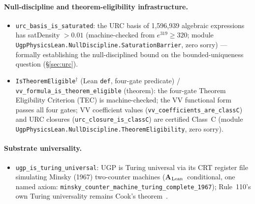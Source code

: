 \documentclass[11pt]{article}
\theoremstyle{remark}
\newcommand{\CatAL}{\textbf{A}$_{\rm Lean}$}
\begin{document}
\begin{appendices}
\paragraph{Null-discipline and theorem-eligibility infrastructure.}
\begin{sloppypar}
\begin{itemize}[leftmargin=1.2em,itemsep=0.1em,topsep=0.2em]
  \item \texttt{urc\_basis\_is\_saturated}: the URC basis of 1,596,939 algebraic expressions has satDensity $>0.01$ (machine-checked from $e^{319}\ge320$; module \texttt{UgpPhysicsLean.NullDiscipline.SaturationBarrier}, zero sorry) --- formally establishing the null-disciplined bound on the bounded-uniqueness question (\S\ref{sec:urc}).
  \item \texttt{IsTheoremEligible}$^{\dagger}$ (Lean \texttt{def}, four-gate predicate) / \texttt{vv\_formula\_is\_theorem\_eligible} (theorem): the four-gate Theorem Eligibility Criterion (TEC) is machine-checked; the VV functional form passes all four gates; VV coefficient values (\texttt{vv\_coefficients\_are\_classC}) and URC closures (\texttt{urc\_closure\_is\_classC}) are certified Class~C (module \texttt{UgpPhysicsLean.NullDiscipline.TheoremEligibility}, zero sorry).
\end{itemize}
\end{sloppypar}

\paragraph{Substrate universality.}
\begin{itemize}[leftmargin=1.2em,itemsep=0.1em,topsep=0.2em]
  \item \texttt{ugp\_is\_turing\_universal}: UGP is Turing universal via its CRT register file simulating Minsky (1967) two-counter machines (\CatAL\ conditional, one named axiom: \texttt{minsky\_counter\_machine\_turing\_complete\_1967}); Rule~110's own Turing universality remains Cook's theorem~\cite{Cook2004}.
\end{itemize}


\end{appendices}
\end{document}
